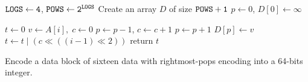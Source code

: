 \begin{algorithm}
\SetAlgoNoLine
{}

$\tt{LOGS} \gets 4$, $\tt{POWS} \gets 2^{\tt{LOGS}}$ \;
Create an array $D$ of size $\tt{POWS}+1$ \;
$p \gets 0$, $D[0] \gets \infty$ \;

$t \gets 0$ \;
 {
  $v \gets A[i], \; c \gets 0$\;
   {
    $p \gets p - 1$, $c \gets c + 1$ \;
  }
  $p \gets p + 1$ \;
  $D[p] \gets v$ \;
  $t \gets t \mathrel{|} (c \ll ((i-1) \ll 2))$ \;
}
return $t$ \;

  \caption{Encode a data block of sixteen data with rightmost-pops
    encoding into a 64-bits integer.}
  \label{alg:cartesian-to-64bits}
\end{algorithm}
